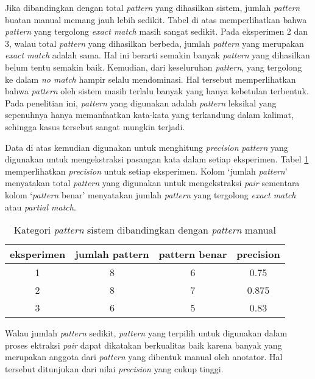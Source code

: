 Jika dibandingkan dengan total \textit{pattern} yang dihasilkan sistem, jumlah \textit{pattern} buatan manual memang jauh lebih sedikit. Tabel di atas memperlihatkan bahwa \textit{pattern} yang tergolong \textit{exact match} masih sangat sedikit. Pada eksperimen 2 dan 3, walau total \textit{pattern} yang dihasilkan berbeda, jumlah \textit{pattern} yang merupakan \textit{exact match} adalah sama. Hal ini berarti semakin banyak \textit{pattern} yang dihasilkan belum tentu semakin baik. Kemudian, dari keseluruhan \textit{pattern}, yang tergolong ke dalam \textit{no match} hampir selalu mendominasi. Hal tersebut memperlihatkan bahwa  \textit{pattern} oleh sistem masih terlalu banyak yang hanya kebetulan terbentuk. Pada penelitian ini, \textit{pattern} yang digunakan adalah \textit{pattern} leksikal yang sepenuhnya hanya memanfaatkan kata-kata yang terkandung dalam kalimat, sehingga kasus tersebut sangat mungkin terjadi.

Data di atas kemudian digunakan untuk menghitung \textit{precision} \textit{pattern} yang digunakan untuk mengekstraksi pasangan kata dalam setiap eksperimen. Tabel \ref{table:preceks} memperlihatkan \textit{precision} untuk setiap eksperimen. Kolom `jumlah \textit{pattern}' menyatakan total \textit{pattern} yang digunakan untuk mengekstraksi \textit{pair} sementara kolom `\textit{pattern} benar' menyatakan jumlah \textit{pattern} yang tergolong \textit{exact match} atau \textit{partial match}. 

\begin{table}
  \centering
  \caption{Kategori \textit{pattern} sistem dibandingkan dengan \textit{pattern} manual}
  \label{table:preceks}
  \begin{tabular}{|c|c|c|c|} 
  \hline
  eksperimen & jumlah pattern & pattern benar & precision \\ \hline
  1 & 8 & 6 & 0.75 \\ \hline
  2 & 8 & 7 & 0.875 \\ \hline
  3 & 6 & 5 & 0.83 \\ \hline
  \end{tabular} 
\end{table}

Walau jumlah \textit{pattern} sedikit, \textit{pattern} yang terpilih untuk digunakan dalam proses ektraksi \textit{pair} dapat dikatakan berkualitas baik karena banyak yang merupakan anggota dari \textit{pattern} yang dibentuk manual oleh anotator. Hal tersebut ditunjukan dari nilai \textit{precision} yang cukup tinggi.

